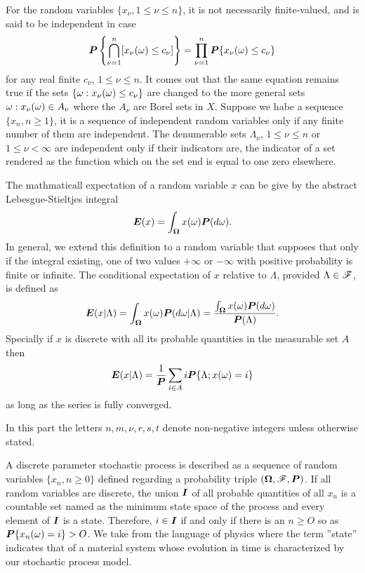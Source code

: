 For the random variables $\{x_\nu, 1\leq \nu \leq n\}$, it is not necessarily finite-valued, and is said to be independent in case
\begin{equation}
\boldsymbol{P} \left\{\bigcap_{\nu=1}^n [x_\nu(\omega)\leq c_\nu]\right\} = \prod_{\nu =1}^n \boldsymbol{P}\{x_\nu (\omega)\leq c_\nu\}
\end{equation}
for any real finite $c_\nu$, $1\leq \nu \leq n$. It comes out that the same equation remains true if the sets $\{\omega :x_\nu (\omega)\leq c_\nu\}$ are changed to the more general sets ${\omega :x_\nu(\omega)\in A_\nu}$ where the $A_\nu$ are Borel sets in $X$. Suppose we habe a sequence $\{x_n,n\geq 1\}$, it is a sequence of independent random variables only if any finite number of them are independent. The denumerable sets $\Lambda_\nu$, $1\leq \nu \leq n$ or $1\leq \nu < \infty$ are independent only if their indicators are, the indicator of a set rendered as the function which on the set end is equal to one zero elsewhere.

The mathmaticall expectation of a random variable $x$ can be give by the abstract Lebesgue-Stieltjes integral
\begin{equation}
    \boldsymbol{E}(x) = \int_{\boldsymbol{\Omega}} x(\omega) \boldsymbol{P}(d\omega).
\end{equation}
In general, we extend this definition to a random variable that supposes that only if the integral existing, one of two values $+\infty$ or $-\infty$ with positive probability is finite or infinite. The conditional expectation of $x$ relative to $\Lambda$, provided $\Lambda \in \mathscr{F}$, is defined as
\begin{equation}
    \boldsymbol{E}(x|\Lambda) = \int_{\boldsymbol{\Omega}}x(\omega) \boldsymbol{P}(d\omega|\Lambda) = \frac{\int_{\boldsymbol{\Omega}}x(\omega) \boldsymbol{P}(d\omega)}{\boldsymbol{P}(\Lambda)}.
\end{equation}
Specially if $x$ is discrete with all its probable quantities in the measurable set $A$ then
\begin{equation}
    \boldsymbol{E}(x|\Lambda)=\frac{1}{\boldsymbol{P}} \sum_{i\in A} i\boldsymbol{P}\{\Lambda; x(\omega)= i\}
\end{equation} 
as long as the series is fully converged.

In this part the letters $n, m, \nu, r ,s ,t $ denote non-negative integers unless otherwise stated.

A discrete parameter stochastic process is described as a sequence of random variables $\{x_n, n\geq 0\}$ defined regarding a probability triple $(\boldsymbol{\Omega}, \mathscr{F}, \boldsymbol{P})$. If all random variables are discrete, the union $\boldsymbol{I}$ of all probable quantities of all $x_n$ is a countable set named as the minimum state space of the process and every element of $\boldsymbol{I}$ is a state. Therefore, $i\in \boldsymbol{I}$ if and only if there is an $n \geq O$ so as $\boldsymbol{P}\{x_n(\omega) = i\} >  O$. We take from the language of physics where the term ''state'' indicates that of a  material system whose evolution in time is characterized by our stochastic process model.

